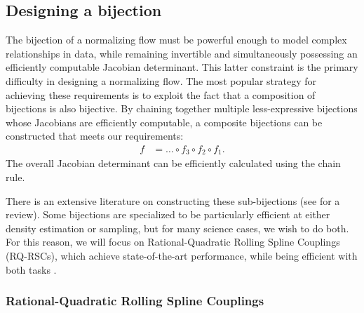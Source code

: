 \documentclass[twocolumn,twocolappendix]{aastex631}
\begin{document}
\subsection{Designing a bijection}
\label{sec:bijections}

The bijection of a normalizing flow must be powerful enough to model complex relationships in data, while remaining invertible and simultaneously possessing an efficiently computable Jacobian determinant.
This latter constraint is the primary difficulty in designing a normalizing flow.
The most popular strategy for achieving these requirements is to exploit the fact that a composition of bijections is also bijective.
By chaining together multiple less-expressive bijections whose Jacobians are efficiently computable, a composite bijections can be constructed that meets our requirements:
\begin{align}
    f &= \dots \circ f_3 \circ f_2 \circ f_1.
\end{align}
The overall Jacobian determinant can be efficiently calculated using the chain rule.

There is an extensive literature on constructing these sub-bijections (see \citealt{kobyzev2020} for a review).
Some bijections are specialized to be particularly efficient at either density estimation or sampling, but for many science cases, we wish to do both.
For this reason, we will focus on Rational-Quadratic Rolling Spline Couplings (RQ-RSCs), which achieve state-of-the-art performance, while being efficient with both tasks \citep{durkan2019}.

\subsubsection{Rational-Quadratic Rolling Spline Couplings}
\label{sec:rq-rsc}
\end{document}
